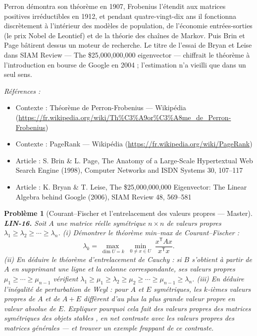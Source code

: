 \documentclass[11pt]{article}
\newtheorem{problem}{Problème}
\newenvironment{refs}{\par\small\noindent\emph{Références :}\begin{itemize}\setlength\itemsep{0pt}}{\end{itemize}\normalsize}
\begin{document}
\noindent Perron démontra son théorème en 1907, Frobenius l'étendit aux matrices positives
irréductibles en 1912, et pendant quatre-vingt-dix ans il fonctionna discrètement à l'intérieur des
modèles de population, de l'économie entrées-sorties (le prix Nobel de Leontief) et de la théorie des
chaînes de Markov. Puis Brin et Page bâtirent dessus un moteur de recherche. Le titre de l'essai de
Bryan et Leise dans SIAM Review --- \og{} The \$25,000,000,000 eigenvector \fg{} --- chiffrait le théorème à
l'introduction en bourse de Google en 2004 ; l'estimation n'a vieilli que dans un seul sens.

\begin{refs}
\item Contexte : Théorème de Perron-Frobenius --- Wikipédia (\url{https://fr.wikipedia.org/wiki/Th%C3%A9or%C3%A8me_de_Perron-Frobenius})
\item Contexte : PageRank --- Wikipédia (\url{https://fr.wikipedia.org/wiki/PageRank})
\item Article : S. Brin \& L. Page, \og{} The Anatomy of a Large-Scale Hypertextual Web Search Engine \fg{} (1998), Computer Networks and ISDN Systems 30, 107--117
\item Article : K. Bryan \& T. Leise, \og{} The \$25,000,000,000 Eigenvector: The Linear Algebra behind Google \fg{} (2006), SIAM Review 48, 569--581
\end{refs}

\bigskip

\begin{problem}[{Courant--Fischer et l'entrelacement des valeurs propres --- Master}]
\textbf{LIN-16.} Soit $A$ une matrice réelle symétrique $n \times n$ de
valeurs propres $\lambda_1 \ge \lambda_2 \ge \cdots \ge \lambda_n$. (i) Démontrer le théorème
min--max de Courant--Fischer :
\[ \lambda_k = \max_{\dim U = k} \; \min_{0 \ne x \in U} \; \frac{x^{\mathsf{T}} A x}{x^{\mathsf{T}} x}. \]
(ii) En déduire le théorème d'entrelacement de Cauchy : si $B$ s'obtient à partir de $A$ en
supprimant une ligne et la colonne correspondante, ses valeurs propres
$\mu_1 \ge \cdots \ge \mu_{n-1}$ vérifient
$\lambda_1 \ge \mu_1 \ge \lambda_2 \ge \mu_2 \ge \cdots \ge \mu_{n-1} \ge \lambda_n$.
(iii) En déduire l'inégalité de perturbation de Weyl : pour $A$ et $E$ symétriques, les
$k$-ièmes valeurs propres de $A$ et de $A + E$ diffèrent d'au plus la plus grande valeur propre
en valeur absolue de $E$. Expliquer pourquoi cela fait des valeurs propres des matrices symétriques
des objets \og{} stables \fg{}, en net contraste avec les valeurs propres des matrices générales --- et trouver
un exemple frappant de ce contraste.
\end{problem}
\end{document}
